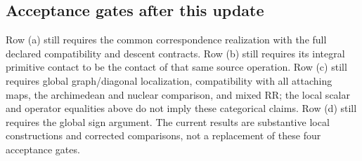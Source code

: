 \subsection{Acceptance gates after this update}
Row (a) still requires the common correspondence realization with the full
declared compatibility and descent contracts. Row (b) still requires its
integral primitive contact to be the contact of that same source operation.
Row (c) still requires global graph/diagonal localization, compatibility
with all attaching maps, the archimedean and nuclear comparison, and mixed
RR; the local scalar and operator equalities above do not imply these
categorical claims. Row (d) still requires the global sign argument.
The current results are substantive local constructions and corrected
comparisons, not a replacement of these four acceptance gates.
